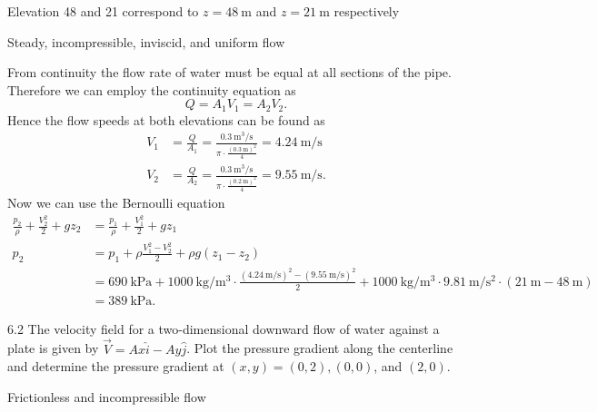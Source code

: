 \begin{assumptions}
  \item Elevation 48 and 21 correspond to $z = \qty{48}{\m}$ and $z = \qty{21}{\m}$ respectively
  \item Steady, incompressible, inviscid, and uniform flow
\end{assumptions}

\begin{derivation}
  From continuity the flow rate of water must be equal at all sections of the pipe.
  Therefore we can employ the continuity equation as
  \[ 
  Q = A_1 V_1 = A_2 V_2
  .\]
  Hence the flow speeds at both elevations can be found as
  \begin{align*}
    V_1 &= \frac{Q}{A_1} = \frac{\qty{0,3}{\cubic\m\per\s} }{\pi \cdot \frac{\left( \qty{0,3}{\m}  \right)^2}{4}} = \qty{4,24}{\m\per\s}  \\
    V_2 &= \frac{Q}{A_2} = \frac{\qty{0,3}{\cubic\m\per\s} }{\pi \cdot \frac{\left( \qty{0,2}{\m}  \right)^2}{4}} = \qty{9,55}{\m\per\s} 
  .\end{align*}
  Now we can use the Bernoulli equation
  \begin{align*}
    \frac{p_2}{\rho} + \frac{V_2^2}{2} + g z_2 &= \frac{p_1}{\rho} + \frac{V_1^2}{2} + g z_1 \\
    p_2 &= p_1 + \rho\frac{V_1^2 - V_2^2}{2} + \rho g \left( z_1 - z_2 \right) \\
        &= \qty{690}{\kPa} + \qty{1000}{\kg\per\cubic\m} \cdot \frac{\left( \qty{4,24}{\m\per\s}  \right)^2 - \left( \qty{9,55}{\m\per\s}  \right)^2}{2} + \qty{1000}{\kg\per\cubic\m} \cdot \qty{9,81}{\m\per\square\s} \cdot \left( \qty{21}{\m} - \qty{48}{\m}  \right) \\
        &= \qty{389}{\kPa} 
  .\end{align*}
\end{derivation}


\begin{problem}{6.2}
  The velocity field for a two-dimensional downward flow of water against a plate is given by $\Vec{V} = A x \hat{i} - A y \hat{j}$.
  Plot the pressure gradient along the centerline and determine the pressure gradient at $(x,y) = (0,2), (0,0)$, and $(2,0)$.
\end{problem}

\begin{assumptions}
  \item Frictionless and incompressible flow
\end{assumptions}

